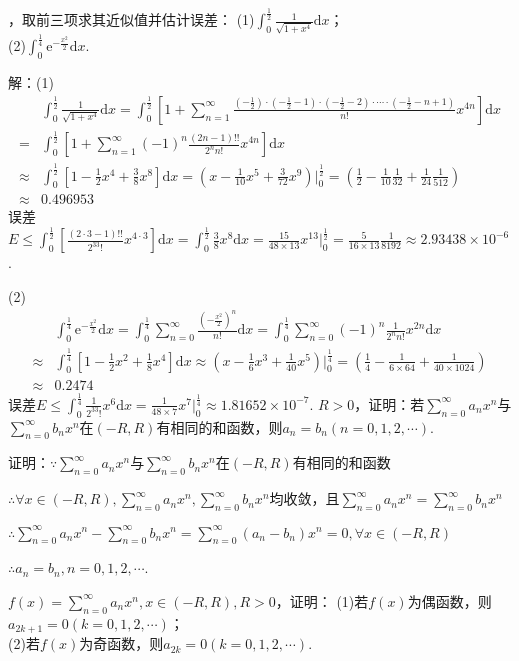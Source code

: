 \documentclass[12pt,UTF8]{ctexart}
\newcommand\Ser[1]{\sum_{n=#1}^\infty}
\begin{document}
\begin{enumerate}
，取前三项求其近似值并估计误差：
\newline
(1)$\int_0^{\frac12}\frac1{\sqrt{1+x^4}}\mathrm dx$；\\
(2)$\int_0^{\frac14}\mathrm e^{-\frac{x^2}2}\mathrm dx$.

解：(1)\[\begin{split}
&\int_0^{\frac12}\frac1{\sqrt{1+x^4}}\mathrm dx=\int_0^{\frac12}[1+\Ser{1}\frac{(-\frac12)\cdot(-\frac12-1)\cdot(-\frac12-2)\cdot\cdots\cdot(-\frac12-n+1)}{n!}x^{4n}]\mathrm dx\\
=&\int_0^{\frac12}[1+\Ser{1}(-1)^n\frac{(2n-1)!!}{2^nn!}x^{4n}]\mathrm dx\\
\approx&\int_0^{\frac12}[1-\frac12x^4+\frac38x^8]\mathrm dx=(x-\frac1{10}x^5+\frac3{72}x^9)\Big|_0^{\frac12}=(\frac12-\frac1{10}\frac1{32}+\frac1{24}\frac1{512})\\
\approx&0.496953
\end{split}\]
误差$E\leq\int_0^{\frac12}[\frac{(2\cdot3-1)!!}{2^33!}x^{4\cdot3}]\mathrm dx=\int_0^{\frac12}\frac38x^8\mathrm dx=\frac{15}{48\times13}x^{13}\Big|_0^{\frac12}=\frac5{16\times13}\frac1{8192}\approx2.93438\times10^{-6}$.

(2)\[\begin{split}
&\int_0^{\frac14}\mathrm e^{-\frac{x^2}2}\mathrm dx=\int_0^{\frac14}\Ser{0}\frac{(-\frac{x^2}2)^n}{n!}\mathrm dx=\int_0^{\frac14}\Ser{0}(-1)^n\frac1{2^nn!}x^{2n}\mathrm dx\\
\approx&\int_0^{\frac14}[1-\frac12x^2+\frac1{8}x^4]\mathrm dx\approx(x-\frac16x^3+\frac1{40}x^5)\Big|_0^{\frac14}=(\frac14-\frac1{6\times64}+\frac1{40\times1024})\\
\approx&0.2474
\end{split}\]
误差$E\leq\int_0^{\frac14}\frac1{2^33!}x^{6}\mathrm dx=\frac1{48\times7}x^7\Big|_0^{\frac14}\approx1.81652\times10^{-7}$.
$R>0$，证明：若$\Ser{0}a_nx^n$与$\Ser{0}b_nx^n$在$(-R,R)$有相同的和函数，则$a_n=b_n(n=0,1,2,\cdots)$.

证明：$\because\Ser{0}a_nx^n$与$\Ser{0}b_nx^n$在$(-R,R)$有相同的和函数

$\therefore\forall x\in(-R,R),\Ser{0}a_nx^n,\Ser{0}b_nx^n$均收敛，且$\Ser{0}a_nx^n=\Ser{0}b_nx^n$

$\therefore\Ser{0}a_nx^n-\Ser{0}b_nx^n=\Ser{0}(a_n-b_n)x^n=0,\forall x\in(-R,R)$

$\therefore a_n=b_n,n=0,1,2,\cdots$.

$f(x)=\Ser{0}a_nx^n,x\in(-R,R),R>0$，证明：
\newline
(1)若$f(x)$为偶函数，则$a_{2k+1}=0(k=0,1,2,\cdots)$；\\
(2)若$f(x)$为奇函数，则$a_{2k}=0(k=0,1,2,\cdots)$.


\end{enumerate}
\end{document}
